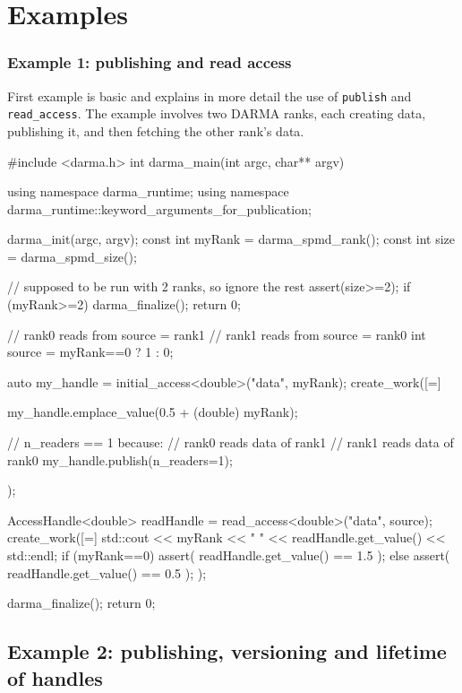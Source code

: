 
\chapter{Examples}
\label{chap:examples}




\subsection{Example 1: publishing and read access}

First example is basic and explains in more detail the use of \texttt{publish} 
and \texttt{read\_access}. The example involves two DARMA ranks, each creating 
data, publishing it, and then fetching the other rank's data.

\begin{CppCodeNumb}
#include <darma.h>
int darma_main(int argc, char** argv)
{
  using namespace darma_runtime;
  using namespace darma_runtime::keyword_arguments_for_publication;

  darma_init(argc, argv);
  const int myRank = darma_spmd_rank();
  const int size = darma_spmd_size();

  // supposed to be run with 2 ranks, so ignore the rest
  assert(size>=2);
  if (myRank>=2){
    darma_finalize();
    return 0;
  }

  // rank0 reads from source = rank1 
  // rank1 reads from source = rank0 
  int source = myRank==0 ? 1 : 0;

  auto my_handle = initial_access<double>("data", myRank);
  create_work([=]
  {
    my_handle.emplace_value(0.5 + (double) myRank);

    // n_readers == 1 because: 
    //  rank0 reads data of rank1
    //  rank1 reads data of rank0
    my_handle.publish(n_readers=1);
  });

  AccessHandle<double> readHandle = read_access<double>("data", source);
  create_work([=]
  {
    std::cout << myRank << " " << readHandle.get_value() << std::endl;
    if (myRank==0)
      assert( readHandle.get_value() == 1.5 );
    else
      assert( readHandle.get_value() == 0.5 );
  });

  darma_finalize();
  return 0;
}
\end{CppCodeNumb}






\section{Example 2: publishing, versioning and lifetime of handles}

